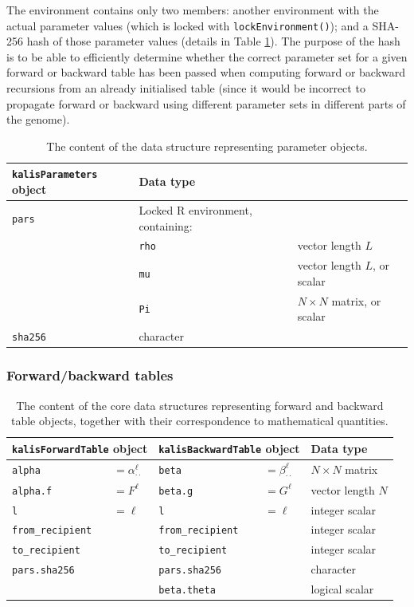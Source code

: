 \documentclass[pdflatex,referee,lineno,sn-nature]{sn-jnl}%
\let\proglang=\textsf
\begin{document}
The environment contains only two members: another environment with the actual parameter values (which is locked with \texttt{lockEnvironment()}); and a SHA-256 hash of those parameter values (details in Table \ref{tab:pars}).
The purpose of the hash is to be able to efficiently determine whether the correct parameter set for a given forward or backward table has been passed when computing forward or backward recursions from an already initialised table (since it would be incorrect to propagate forward or backward using different parameter sets in different parts of the genome).

\begin{table}[tbp]
	\centering
	\begin{tabular}{l|ll}
		\hline
		\texttt{kalisParameters} object & Data type & \\ \hline\hline
		\texttt{pars} & Locked \proglang{R} environment, containing: \\
		& \texttt{rho} & vector length $L$ \\
		& \texttt{mu} & vector length $L$, or scalar \\
		& \texttt{Pi} & $N \times N$ matrix, or scalar \\
		\texttt{sha256} & character & \\ \hline
	\end{tabular}
	\caption{The content of the data structure representing parameter objects.}
	\label{tab:pars}
\end{table}



\subsubsection*{Forward/backward tables}
\label{forwardbackward-tables}

\begin{table}[tbp]
	\centering
	\begin{tabular}{ll|ll|l}
		\hline
		\multicolumn{2}{l|}{\texttt{kalisForwardTable} object} &   \multicolumn{2}{l|}{\texttt{kalisBackwardTable} object} & Data type \\ \hline\hline
		\texttt{alpha} & $= \alpha^\ell_{\cdot\cdot}$ & \texttt{beta} & $= \beta^\ell_{\cdot\cdot}$  & $N   \times N$ matrix \\
		\texttt{alpha.f} & $= F^\ell$ & \texttt{beta.g} & $= G^\ell$ & vector length $N$ \\
		\texttt{l} & $= \ell$ & \texttt{l} & $= \ell$ & integer scalar \\
		\texttt{from\_recipient} & & \texttt{from\_recipient} & & integer scalar \\
		\texttt{to\_recipient} & & \texttt{to\_recipient} & & integer scalar \\
		\texttt{pars.sha256} & & \texttt{pars.sha256} & & character \\
		& & \texttt{beta.theta} & & logical scalar \\ \hline
	\end{tabular}
	\caption{The content of the core data structures representing forward and backward table objects, together with their correspondence to mathematical quantities.}
	\label{tab:fwdbck}
\end{table}
\end{document}

